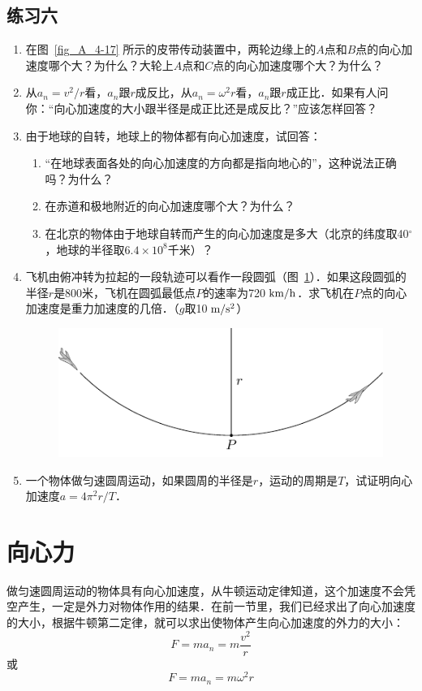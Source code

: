 \subsection*{练习六}
\begin{enumerate}
    \item 在图~\ref{fig_A_4-17} 所示的皮带传动装置中，两轮边缘上的$A$点和$B$点的向心加速度哪个大？为什么？大轮上$A$点和$C$点的向心加速度哪个大？为什么？
    \item 从$a_n=v^2/r$看，$a_n$跟$r$成反比，从$a_n=\omega^2r$看，$a_n$跟$r$成正比．如果有人问你：“向心加速度的大小跟半径是成正比还是成反比？”应该怎样回答？
    \item 由于地球的自转，地球上的物体都有向心加速度，试回答：
\begin{enumerate}
    \item “在地球表面各处的向心加速度的方向都是指向地心的”，这种说法正确吗？为什么？
    \item 在赤道和极地附近的向心加速度哪个大？为什么？
    \item 在北京的物体由于地球自转而产生的向心加速度是多大（北京的纬度取40$^\circ$，地球的半径取$6.4\times 10^8$千米）？    
\end{enumerate}
\item     飞机由俯冲转为拉起的一段轨迹可以看作一段圆弧（图~\ref{fig_A_4-19}）．如果这段圆弧的半径$r$是800米，飞机在圆弧最低点$P$的速率为720$\;\text{km}/\text{h}$．求飞机在$P$点的向心加速度是重力加速度的几倍．（$g$取10$\;\text{m}/\text{s}^2$）
\begin{figure}[htbp]
    \centering
    \includegraphics{fig/A/4-19.pdf}
    \caption{}\label{fig_A_4-19}
\end{figure}

    \item 一个物体做匀速圆周运动，如果圆周的半径是$r$，运动的周期是$T$，试证明向心加速度$a=4\pi^2r/T$．
\end{enumerate}

\section{向心力}
做匀速圆周运动的物体具有向心加速度，从牛顿运动定律知道，这个加速度不会凭空产生，一定是外力对物体作用的结果．在前一节里，我们已经求出了向心加速度的大小，根据牛顿第二定律，就可以求出使物体产生向心加速度的外力的大小：
\[F=ma_n=m\frac{v^2}{r} \]
或
\[F=ma_n=m\omega^2 r \]

